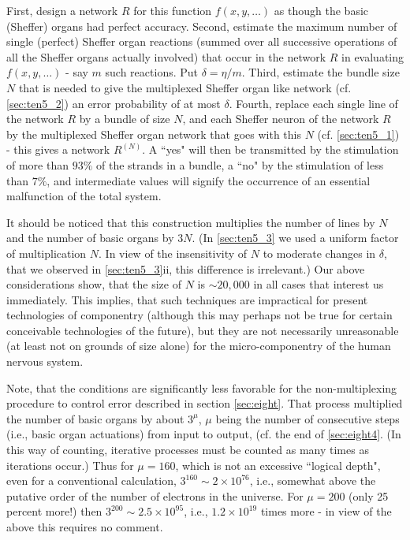 \documentclass[twocolumn,preprintnumbers,amsmath,amssymb,floatfix]{revtex4}
\begin{document}
First, design a network $R$ for this function $f(x, y, \dots)$ as
though the basic (Sheffer) organs had perfect accuracy. Second,
estimate the maximum number of single (perfect) Sheffer organ
reactions (summed over all successive operations of all the
Sheffer organs actually involved) that occur in the network $R$ in
evaluating $f(x, y, \ldots)$ - say $m$ such reactions. Put
$\delta=\eta/m$. Third, estimate the bundle size $N$ that is
needed to give the multiplexed Sheffer organ like network (cf.
\ref{sec:ten5_2}) an error probability of at most $\delta$.
Fourth, replace each single line of the network $R$ by a bundle of
size $N$, and each Sheffer neuron of the network $R$ by the
multiplexed Sheffer organ network that goes with this $N$ (cf.
\ref{sec:ten5_1}) - this gives a network $R^{(N)}$. A ``yes" will
then be transmitted by the stimulation of more than $93\%$ of the
strands in a bundle, a ``no" by the stimulation of less than
$7\%$, and intermediate values will signify the occurrence of an
essential malfunction of the total system.

It should be noticed that this construction multiplies the number
of lines by $N$ and the number of basic organs by $3N$. (In
\ref{sec:ten5_3} we used a uniform factor of multiplication $N$.
In view of the insensitivity of $N$ to moderate changes in
$\delta$, that we observed in \ref{sec:ten5_3}ii, this difference
is irrelevant.) Our above considerations show, that the size of
$N$ is $\sim 20,000$ in all cases that interest us immediately.
This implies, that such techniques are impractical for present
technologies of componentry (although this may perhaps not be true
for certain conceivable technologies of the future), but they are
not necessarily unreasonable (at least not on grounds of size
alone) for the micro-componentry of the human nervous system.

Note, that the conditions are significantly less favorable for the
non-multiplexing procedure to control error described in section
\ref{sec:eight}. That process multiplied the number of basic
organs by about $3^\mu$, $\mu$ being the number of consecutive
steps (i.e., basic organ actuations) from input to output, (cf.
the end of \ref{sec:eight4}. (In this way of counting, iterative
processes must be counted as many times as iterations occur.) Thus
for $\mu=160$, which is not an excessive ``logical depth", even
for a conventional calculation, $3^{160}\sim2\times10^{76}$, i.e.,
somewhat above the putative order of the number of electrons in
the universe. For $\mu=200$ (only 25 percent more!) then
$3^{200}\sim2.5\times10^{95}$, i.e., $1.2\times10^{19}$ times more
- in view of the above this requires no comment.
\end{document}

